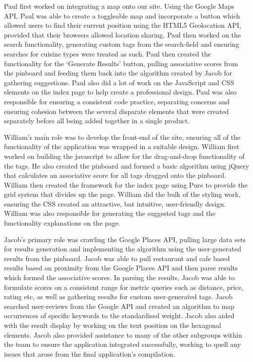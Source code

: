 \documentclass[10pt,a4paper]{article}
\begin{document}
Paul first worked on integrating a map onto our site. Using the Google Maps API, Paul was able to create a toggleable map and incorporate a button which allowed users to find their current position using the HTML5 Geolocation API, provided that their browsers allowed location sharing. Paul then worked on the search functionality, generating custom tags from the search-field and ensuring searches for cuisine types were treated as such. Paul then created the functionality for the ‘Generate Results’ button, pulling associative scores from the pinboard and feeding them back into the algorithm created by Jacob for gathering suggestions. Paul also did a lot of work on the JavaScript and CSS elements on the index page to help create a professional design. Paul was also responsible for ensuring a consistent code practice, separating concerns and ensuring cohesion between the several disparate elements that were created separately before all being added together in a single product.

William’s main role was to develop the front-end of the site, ensuring all of the functionality of the application was wrapped in a suitable design. William first worked on building the javascript to allow for the drag-and-drop functionality of the tags. He also created the pinboard and formed a basic algorithm using jQuery that calculates an associative score for all tags dragged onto the pinboard. William then created the framework for the index page using Pure to provide the grid system that divides up the page. William did the bulk of the styling work, ensuring the CSS created an attractive, but intuitive, user-friendly design. William was also responsible for generating the suggested tags and the functionality explanations on the page.

Jacob’s primary role was crawling the Google Places API, pulling large data sets for results generation and implementing the algorithm using the user-generated results from the pinboard. Jacob was able to pull restaurant and cafe based results based on proximity from the Google Places API and then parse results which formed the associative scores. In parsing the results, Jacob was able to formulate scores on a consistent range for metric queries such as distance, price, rating etc, as well as gathering results for custom user-generated tags. Jacob searched user-reviews from the Google API and created an algorithm to map occurrences of specific keywords to the standardised weight. Jacob also aided with the result display by working on the text position on the hexagonal elements. Jacob also provided assistance to many of the other subgroups within the team to ensure the application integrated successfully, working to quell any issues that arose from the final application's compilation.
\end{document}

